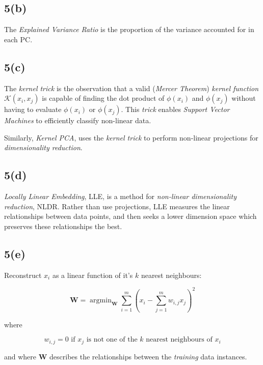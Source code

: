 \documentclass[12pt, a4paper,reqno]{article}
\DeclareMathOperator*{\argmin}{argmin}
\begin{document}
\subsection*{5(b)}

The \emph{Explained Variance Ratio} is the proportion of the variance accounted for in each PC. 

\subsection*{5(c)}

The \emph{kernel trick} is the observation that a valid (\emph{Mercer Theorem}) \emph{kernel function} $\mathcal{K}(x_i, x_j)$ is capable of finding the dot product of $\phi(x_i)$ and $\phi(x_j)$ without having to evaluate $\phi(x_i)$ or $\phi(x_j)$. This \emph{trick} enables \emph{Support Vector Machines} to efficiently classify non-linear data.

Similarly, \emph{Kernel PCA}, uses the \emph{kernel trick} to perform non-linear projections for \emph{dimensionality reduction}.

\subsection*{5(d)}
\emph{Locally Linear Embedding}, LLE, is a method for \emph{non-linear dimensionality reduction}, NLDR. Rather than use projections, LLE measures the linear relationships between data points, and then seeks a lower dimension space which preserves these relationships the best. 

\subsection*{5(e)}

Reconstruct $x_i$ as a linear function of it's $k$ nearest neighbours:

\begin{equation}
\mathbf{W} = \argmin_{\mathbf{W}}\sum_{i=1}^{m}\left(x_i - \sum_{j=1}^{m} w_{i, j}x_j\right)^2
\end{equation}

where

\begin{equation}
w_{i,j} = 0\text{ if $x_j$ is not one of the $k$ nearest neighbours of $x_i$}
\end{equation}

and where $\mathbf{W}$ describes the relationships between the \emph{training} data instances.
\end{document}
